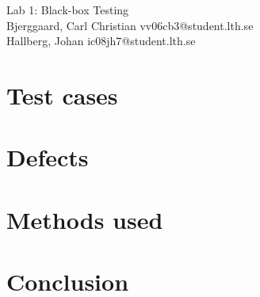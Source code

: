 \documentclass[titlepage]{article}
\begin{document}
\begin{center}
	\huge{Lab 1: Black-box Testing } \\
	\small{Bjerggaard, Carl Christian vv06cb3@student.lth.se \\Hallberg, Johan ic08jh7@student.lth.se}

\vspace*{1cm}

\end{center}

\thispagestyle{empty}

\clearpage
\section{Test cases}
\label{testcases}


\clearpage
\section{Defects}
\label{defects}


\clearpage
\section{Methods used}
\label{methods}


\clearpage
\section{Conclusion}
\label{conclusion}

\end{document}
